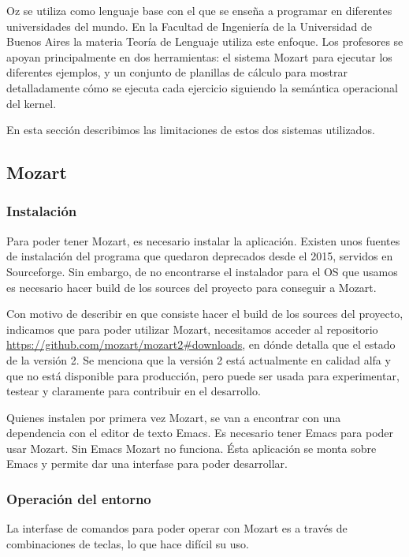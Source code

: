 \documentclass[a4paper,11pt]{article}
\begin{document}
Oz se utiliza como lenguaje base con el que se enseña a programar en diferentes universidades del mundo. En la Facultad de Ingeniería de la Universidad de Buenos Aires la materia Teoría de Lenguaje utiliza este enfoque. Los profesores se apoyan principalmente en dos herramientas: el sistema Mozart para ejecutar los diferentes ejemplos, y un conjunto de planillas de cálculo para mostrar detalladamente cómo se ejecuta cada ejercicio siguiendo la semántica operacional del kernel.

En esta sección describimos las limitaciones de estos dos sistemas utilizados.

\subsection{Mozart}

\subsubsection{Instalación}

Para poder tener Mozart, es necesario instalar la aplicación. Existen unos fuentes de instalación del programa que quedaron deprecados desde el 2015, servidos en Sourceforge. Sin embargo, de no encontrarse el instalador para el OS que usamos es necesario hacer build de los sources del proyecto para conseguir a Mozart.

Con motivo de describir en que consiste hacer el build de los sources del proyecto, indicamos que para poder utilizar Mozart, necesitamos acceder al repositorio \url{https://github.com/mozart/mozart2#downloads}, en dónde detalla que el estado de la versión 2. Se menciona que la versión 2 está actualmente en calidad alfa y que no está disponible para producción, pero puede ser usada para experimentar, testear y claramente para contribuir en el desarrollo.

Quienes instalen por primera vez Mozart, se van a encontrar con una dependencia con el editor de texto Emacs. Es necesario tener Emacs para poder usar Mozart. Sin Emacs Mozart no funciona. Ésta aplicación se monta sobre Emacs y permite dar una interfase para poder desarrollar.

\subsubsection{Operación del entorno}

La interfase de comandos para poder operar con Mozart es a través de combinaciones de teclas, lo que hace difícil su uso.
\end{document}
